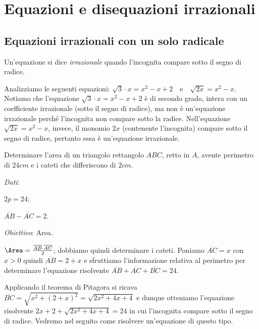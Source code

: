 \chapter{Equazioni e disequazioni irrazionali}
\section{Equazioni irrazionali con un solo radicale}

\begin{definizione}
Un'equazione si dice \emph{irrazionale} quando l'incognita compare sotto il segno di radice.
\end{definizione}

Analizziamo le seguenti equazioni: $\sqrt 3\cdot x=x^2-x+2$~~e~~$\sqrt{2x}=x^2-x$.
Notiamo che l'equazione $\sqrt 3\cdot x=x^2-x+2$ è di secondo grado, intera con un coefficiente irrazionale (sotto il segno di radice), ma non è un'equazione irrazionale perché l'incognita non compare sotto la radice.
Nell'equazione $\sqrt{2x}=x^2-x$, invece, il monomio $ 2x $ (contenente l'incognita) compare sotto il segno di radice, pertanto essa è un'equazione irrazionale.
\begin{problema}
Determinare l'area di un triangolo rettangolo $ABC$, retto in $A$, avente perimetro di $24\unit{cm}$ e i cateti che differiscono di $2\unit{cm}$.
\end{problema}

\begin{multicols}{2}
\emph{Dati}:

$2p=24$;

$\overline{AB}-\overline{AC}=2$.

\emph{Obiettivo}:
Area.


\end{multicols}

\begin{soluzione}
${\Area}=\frac{\overline{AB}\cdot \overline{AC}} 2$; dobbiamo quindi determinare i cateti. Poniamo $\overline{AC}=x$ con $x>0$ quindi $\overline{AB}=2+x$ e sfruttiamo l'informazione relativa al perimetro per determinare l'equazione risolvente $\overline{AB}+\overline{AC}+\overline{BC}=24$.

Applicando il teorema di Pitagora si ricava $\overline{BC}=\sqrt{x^2+(2+x)^2}=\sqrt{2x^2+4x+4}$ e dunque otteniamo l'equazione risolvente $2x+2+\sqrt{2x^2+4x+4}=24$ in cui l'incognita compare sotto il segno di radice. Vedremo nel seguito come risolvere un'equazione di questo tipo.
\end{soluzione}

